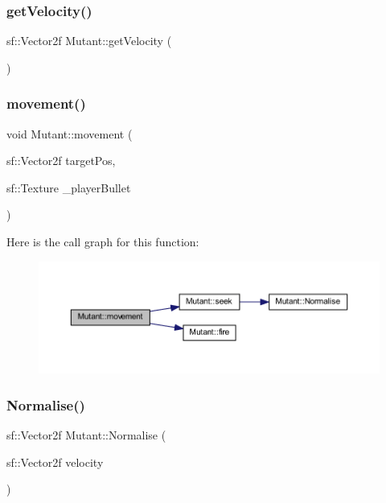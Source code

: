 \mbox{\label{class_mutant_a7455d81b54b869ac1f466bfc08c44ebb}} 
\subsubsection{\texorpdfstring{get\+Velocity()}{getVelocity()}}
{\footnotesize\ttfamily sf\+::\+Vector2f Mutant\+::get\+Velocity (\begin{DoxyParamCaption}{ }\end{DoxyParamCaption})}

\mbox{\label{class_mutant_a95c362ea2f31919f63047b872cfdaf20}} 
\subsubsection{\texorpdfstring{movement()}{movement()}}
{\footnotesize\ttfamily void Mutant\+::movement (\begin{DoxyParamCaption}\item[{sf\+::\+Vector2f}]{target\+Pos,  }\item[{sf\+::\+Texture}]{\+\_\+player\+Bullet }\end{DoxyParamCaption})}

Here is the call graph for this function\+:
\nopagebreak
\begin{figure}[H]
\begin{center}
\leavevmode
\includegraphics[width=350pt]{class_mutant_a95c362ea2f31919f63047b872cfdaf20_cgraph}
\end{center}
\end{figure}
\mbox{\label{class_mutant_a167cab6fa9c2a19f40c9886f043c1270}} 
\subsubsection{\texorpdfstring{Normalise()}{Normalise()}}
{\footnotesize\ttfamily sf\+::\+Vector2f Mutant\+::\+Normalise (\begin{DoxyParamCaption}\item[{sf\+::\+Vector2f}]{velocity }\end{DoxyParamCaption})}

